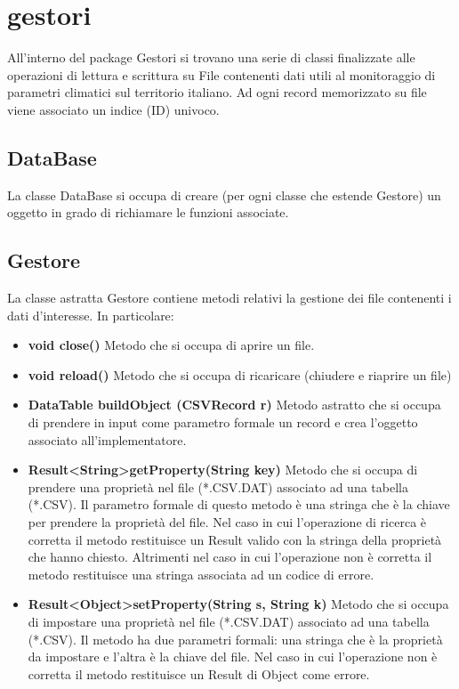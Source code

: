 \documentclass[a4paper, 12pt]{report}
\begin{document}
		\section{gestori}
		All'interno del package Gestori si trovano una serie di classi finalizzate alle operazioni di lettura e scrittura su File contenenti dati utili al monitoraggio di parametri climatici sul territorio italiano.
		Ad ogni record memorizzato su file viene associato un indice (ID) univoco.
			\subsection{DataBase}
			La classe DataBase si occupa di creare (per ogni classe che estende Gestore) un oggetto in grado di richiamare le funzioni associate.
			\subsection{Gestore}
			La classe astratta Gestore contiene metodi relativi la gestione dei file contenenti i dati d'interesse. In particolare:
			\begin{itemize}
				\item \textbf{void close()}
				Metodo che si occupa di aprire un file.
				\item \textbf{void reload()}
				Metodo che si occupa di ricaricare (chiudere e riaprire un file)
			
				\item \textbf {DataTable buildObject (CSVRecord r)}
				Metodo astratto che si occupa di prendere in input come parametro formale un record e crea l'oggetto associato all'implementatore.
				
				\item \textbf{Result\textless String\textgreater getProperty(String key)}
				Metodo che si occupa di prendere una proprietà nel file (*.CSV.DAT) associato ad una tabella (*.CSV). Il parametro formale di questo metodo è una stringa che è la chiave per prendere la proprietà del file. Nel caso in cui l'operazione di ricerca è corretta il metodo restituisce un Result valido con la stringa della proprietà che hanno chiesto. Altrimenti nel caso in cui l'operazione non è corretta il metodo restituisce una stringa associata ad un codice di errore. 
				
				\item  \textbf{Result\textless Object\textgreater setProperty(String s, String k)}
				Metodo che si occupa di impostare una proprietà nel file (*.CSV.DAT) associato ad una tabella (*.CSV). Il metodo ha due parametri formali: una stringa che è la proprietà da impostare e l'altra è la chiave del file. Nel caso in cui l'operazione non è corretta il metodo restituisce un Result di Object come errore.
			\end{itemize}
\end{document}

